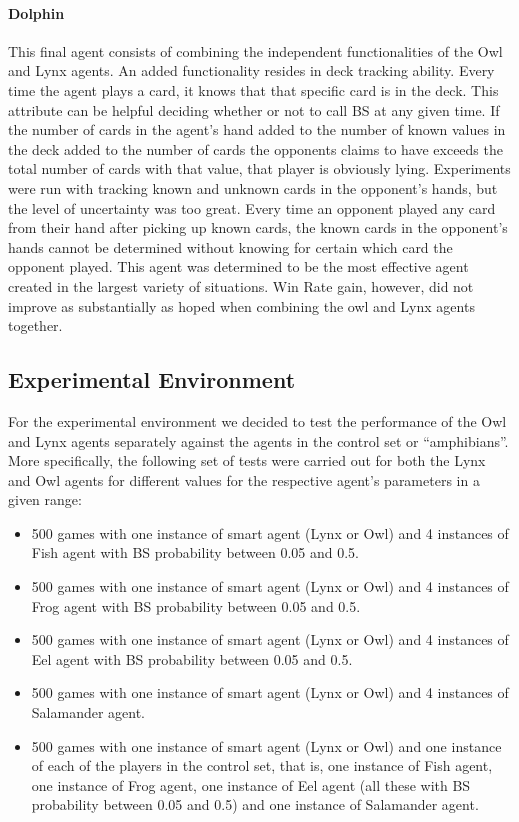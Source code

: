 \documentclass[a4paper,11pt]{article}
\begin{document}
\paragraph{Dolphin}
This final agent consists of combining the independent functionalities of the Owl and Lynx agents. An added functionality resides in deck tracking ability. Every time the agent plays a card, it knows that that specific card is in the deck. This attribute can be helpful deciding whether or not to call BS at any given time. If the number of cards in the agent’s hand added to the number of known values in the deck added to the number of cards the opponents claims to have exceeds the total number of cards with that value, that player is obviously lying. Experiments were run with tracking known and unknown cards in the opponent’s hands, but the level of uncertainty was too great. Every time an opponent played any card from their hand after picking up known cards, the known cards in the opponent’s hands cannot be determined without knowing for certain which card the opponent played. This agent was determined to be the most effective agent created in the largest variety of situations. Win Rate gain, however, did not improve as substantially as hoped when combining the owl and Lynx agents together. 

\subsection{Experimental Environment}
For the experimental environment we decided to test the performance of the Owl and Lynx agents separately against the agents in the control set or “amphibians”. More specifically, the following set of tests were carried out for both the Lynx and Owl agents for different values for the respective agent’s parameters in a given range:
\begin{itemize}
\item 500 games with one instance of smart agent (Lynx or Owl) and 4 instances of Fish agent with BS probability between 0.05 and 0.5.
\item 500 games with one instance of smart agent (Lynx or Owl) and 4 instances of Frog agent with BS probability between 0.05 and 0.5.
\item 500 games with one instance of smart agent (Lynx or Owl) and 4 instances of Eel agent with BS probability between 0.05 and 0.5.
\item 500 games with one instance of smart agent (Lynx or Owl) and 4 instances of Salamander agent.
\item 500 games with one instance of smart agent (Lynx or Owl) and one instance of each of the players in the control set, that is, one instance of Fish agent, one instance of Frog agent, one instance of Eel agent  (all these with BS probability between 0.05 and 0.5) and one instance of Salamander agent.
\end{itemize}
\end{document}
